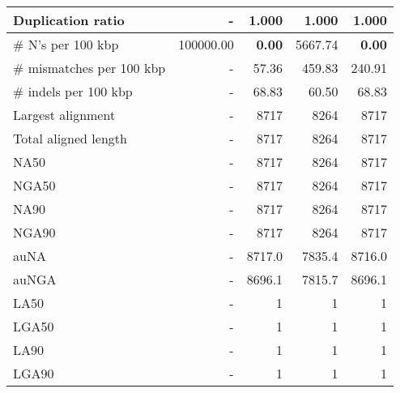 \documentclass[12pt,a4paper]{article}
\begin{document}
\begin{table}[ht]
\begin{center}
\begin{tabular}{|l*{4}{|r}|}
Duplication ratio & - & 1.000 & 1.000 & 1.000 \\ \hline
\# N's per 100 kbp & 100000.00 & {\bf 0.00} & 5667.74 & {\bf 0.00} \\ \hline
\# mismatches per 100 kbp & - & 57.36 & 459.83 & 240.91 \\ \hline
\# indels per 100 kbp & - & 68.83 & 60.50 & 68.83 \\ \hline
Largest alignment & - & 8717 & 8264 & 8717 \\ \hline
Total aligned length & - & 8717 & 8264 & 8717 \\ \hline
NA50 & - & 8717 & 8264 & 8717 \\ \hline
NGA50 & - & 8717 & 8264 & 8717 \\ \hline
NA90 & - & 8717 & 8264 & 8717 \\ \hline
NGA90 & - & 8717 & 8264 & 8717 \\ \hline
auNA & - & 8717.0 & 7835.4 & 8716.0 \\ \hline
auNGA & - & 8696.1 & 7815.7 & 8696.1 \\ \hline
LA50 & - & 1 & 1 & 1 \\ \hline
LGA50 & - & 1 & 1 & 1 \\ \hline
LA90 & - & 1 & 1 & 1 \\ \hline
LGA90 & - & 1 & 1 & 1 \\ \hline
\end{tabular}
\end{center}
\end{table}
\end{document}
